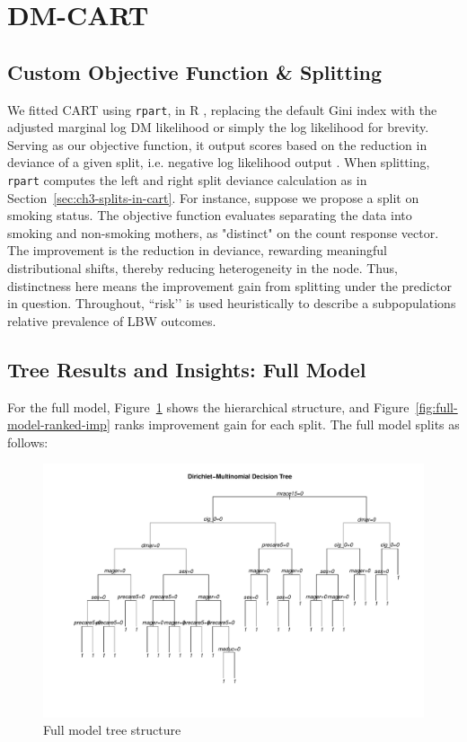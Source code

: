 \section{DM-CART}
\label{sec:ch3-dm-cart}
\subsection{Custom Objective Function \& Splitting}
\label{sec:ch3-objective-function}
We fitted CART using \texttt{rpart}, in R \parencite{rpart_docs}, replacing the default Gini index with the adjusted marginal log DM likelihood or simply the log likelihood for brevity. Serving as our objective function, it output scores based on the reduction in deviance of a given split, i.e. negative log likelihood output \parencite{rpart_docs, intro_to_rpart}. When splitting, \texttt{rpart} computes the left and right split deviance calculation as in Section~\ref{sec:ch3-splits-in-cart}. For instance, suppose we propose a split on smoking status. The objective function evaluates separating the data into smoking and non-smoking mothers, as "distinct" on the count response vector. The improvement is the reduction in deviance, rewarding meaningful distributional shifts, thereby reducing heterogeneity in the node. Thus, distinctness here means the improvement gain from splitting under the predictor in question. Throughout, “risk’’ is used heuristically to describe a subpopulations relative prevalence of LBW outcomes.

\subsection{Tree Results and Insights: Full Model}
\label{sec:ch3-results}
For the full model, Figure~\ref{fig:tree} shows the hierarchical structure, and Figure~\ref{fig:full-model-ranked-imp} ranks improvement gain for each split. The full model splits as follows:

\begin{figure}[H]
  \centering
  \includegraphics[width=1\textwidth]{chapters/chapter3/figures/dm_tree2021.pdf}
  \caption{Full model tree structure}
  \label{fig:tree}
\end{figure}

